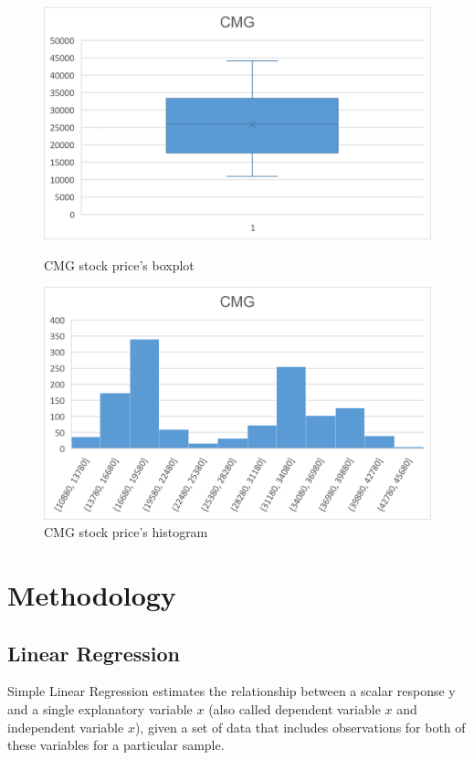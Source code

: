 \documentclass{ieeeojies}
\begin{document}
\begin{figure}[H]
    \centering
    \begin{minipage}{0.23\textwidth}
    \centering
    \includegraphics[width=1\textwidth]{bibliography/Figure/CMG_Quantiles.png}
    \caption{CMG stock price's boxplot}
    \label{fig:1}
    \end{minipage}
    \hfill
    \begin{minipage}{0.23\textwidth}
    \centering
    \includegraphics[width=1\textwidth]{bibliography/Figure/CMG_Bar.png}
    \caption{CMG stock price's histogram}
    \label{fig:2}
    \end{minipage}
\end{figure}
\section{Methodology}
\subsection{Linear Regression}
Simple Linear Regression estimates the relationship between a scalar response y and a single explanatory variable $x$ (also called dependent variable $x$ and independent variable $x$), given a set of data that includes observations for both of these variables for a particular sample. \cite{b5}
\end{document}
